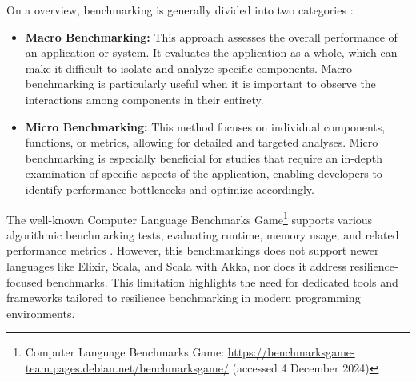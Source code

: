 On a overview, benchmarking is generally divided into two categories \cite{Imam2014,Blessing2019,Valkov2018,Almeida2013}:
\begin{itemize}
    \item \textbf{Macro Benchmarking:} This approach assesses the overall performance of an application or system. It evaluates the application as a whole, which can make it difficult to isolate and analyze specific components. Macro benchmarking is particularly useful when it is important to observe the interactions among components in their entirety.
    \item \textbf{Micro Benchmarking:} This method focuses on individual components, functions, or metrics, allowing for detailed and targeted analyses. Micro benchmarking is especially beneficial for studies that require an in-depth examination of specific aspects of the application, enabling developers to identify performance bottlenecks and optimize accordingly.
\end{itemize}

The well-known Computer Language Benchmarks Game\footnote{Computer Language Benchmarks Game: \url{https://benchmarksgame-team.pages.debian.net/benchmarksgame/} (accessed 4 December 2024)} supports various algorithmic benchmarking tests, evaluating runtime, memory usage, and related performance metrics \cite{Blessing2019}. However, this benchmarkings does not support newer languages like Elixir, Scala, and Scala with Akka, nor does it address resilience-focused benchmarks. This limitation highlights the need for dedicated tools and frameworks tailored to resilience benchmarking in modern programming environments.

